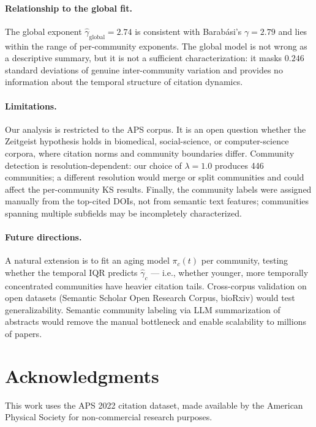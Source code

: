 \documentclass[runningheads]{llncs}
\begin{document}
\paragraph{Relationship to the global fit.}
The global exponent $\hat{\gamma}_{\text{global}} = 2.74$ is consistent with
Barab{\'a}si's $\gamma = 2.79$ \cite{Barabasi2016} and lies within the range of
per-community exponents.  The global model is not wrong as a descriptive
summary, but it is not a sufficient characterization: it masks $0.246$ standard
deviations of genuine inter-community variation and provides no information
about the temporal structure of citation dynamics.

\paragraph{Limitations.}
Our analysis is restricted to the APS corpus.  It is an open question whether
the Zeitgeist hypothesis holds in biomedical, social-science, or computer-science
corpora, where citation norms and community boundaries differ.  Community
detection is resolution-dependent: our choice of $\lambda = 1.0$ produces 446
communities; a different resolution would merge or split communities and could
affect the per-community KS results.  Finally, the community labels were
assigned manually from the top-cited DOIs, not from semantic text features;
communities spanning multiple subfields may be incompletely characterized.

\paragraph{Future directions.}
A natural extension is to fit an aging model $\pi_c(t)$ per community,
testing whether the temporal IQR predicts $\hat{\gamma}_c$ --- i.e., whether
younger, more temporally concentrated communities have heavier citation tails.
Cross-corpus validation on open datasets (Semantic Scholar Open Research Corpus,
bioRxiv) would test generalizability.  Semantic community labeling via LLM
summarization of abstracts would remove the manual bottleneck and enable
scalability to millions of papers.


\section*{Acknowledgments}

This work uses the APS 2022 citation dataset, made available by the American
Physical Society for non-commercial research purposes.



\end{document}
